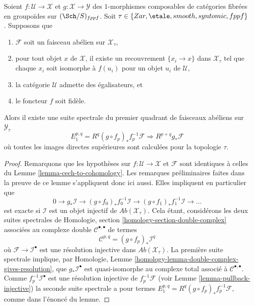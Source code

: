 \begin{lemma}
\label{lemma-cech-to-cohomology-relative}
Soient $f : \mathcal{U} \to \mathcal{X}$ et
$g : \mathcal{X} \to \mathcal{Y}$
des $1$-morphismes composables de catégories fibrées
en groupoïdes sur $(\Sch/S)_{fppf}$. Soit
$\tau \in \{Zar, \etale, smooth, syntomic, \linebreak[0] fppf\}$.
Supposons que
\begin{enumerate}
\item $\mathcal{F}$ soit un faisceau abélien sur $\mathcal{X}_\tau$,
\item pour tout objet $x$ de $\mathcal{X}$, il existe un recouvrement
$\{x_i \to x\}$ dans $\mathcal{X}_\tau$ tel que chaque $x_i$ soit isomorphe
à $f(u_i)$ pour un objet $u_i$ de $\mathcal{U}$,
\item la catégorie $\mathcal{U}$ admette des égalisateurs, et
\item le foncteur $f$ soit fidèle.
\end{enumerate}
Alors il existe une suite spectrale du premier quadrant de faisceaux abéliens
sur $\mathcal{Y}_\tau$
$$
E_1^{p, q} = R^q(g \circ f_p)_*f_p^{-1}\mathcal{F}
\Rightarrow
R^{p + q}g_*\mathcal{F}
$$
où toutes les images directes supérieures sont calculées pour la topologie $\tau$.
\end{lemma}

\begin{proof}
Remarquons que les hypothèses sur $f : \mathcal{U} \to \mathcal{X}$
et $\mathcal{F}$ sont identiques à celles du
Lemme \ref{lemma-cech-to-cohomology}.
Les remarques préliminaires faites dans la preuve de ce lemme
s'appliquent donc ici aussi. Elles impliquent en particulier que
$$
0 \to g_*\mathcal{I} \to
(g \circ f_0)_*f_0^{-1}\mathcal{I} \to
(g \circ f_1)_*f_1^{-1}\mathcal{I} \to \ldots
$$
est exacte si $\mathcal{I}$ est un objet injectif de
$\textit{Ab}(\mathcal{X}_\tau)$.
Cela étant, considérons les deux suites spectrales de
Homologie, section \ref{homology-section-double-complex}
associées au complexe double $\mathcal{C}^{\bullet, \bullet}$ de termes
$$
\mathcal{C}^{p, q} = (g \circ f_p)_*\mathcal{I}^q
$$
où $\mathcal{F} \to \mathcal{I}^\bullet$ est une résolution injective
dans $\textit{Ab}(\mathcal{X}_\tau)$. La première suite spectrale implique, par
Homologie, Lemme \ref{homology-lemma-double-complex-gives-resolution},
que $g_*\mathcal{I}^\bullet$ est quasi-isomorphe au complexe total
associé à $\mathcal{C}^{\bullet, \bullet}$.
Comme $f_p^{-1}\mathcal{I}^\bullet$ est une résolution injective de
$f_p^{-1}\mathcal{F}$ (voir
Lemme \ref{lemma-pullback-injective})
la seconde suite spectrale a pour termes
$E_1^{p, q} = R^q(g \circ f_p)_*f_p^{-1}\mathcal{F}$, comme dans l'énoncé
du lemme.
\end{proof}

